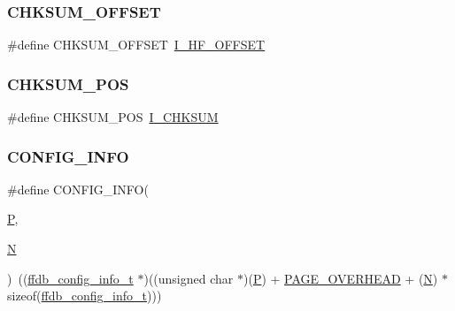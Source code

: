 \subsubsection{\texorpdfstring{CHKSUM\_OFFSET}{CHKSUM\_OFFSET}}
{\footnotesize\ttfamily \#define C\+H\+K\+S\+U\+M\+\_\+\+O\+F\+F\+S\+ET~\mbox{\hyperlink{adat__devel_2other__libs_2filedb_2filehash_2ffdb__page_8h_a1a36cdfb3c84eb14acea8376f6e56c18}{I\+\_\+\+H\+F\+\_\+\+O\+F\+F\+S\+ET}}}

\mbox{\label{adat-devel_2other__libs_2filedb_2filehash_2ffdb__page_8h_a31e1758e4ece4645b0453a914658ea63}} 
\subsubsection{\texorpdfstring{CHKSUM\_POS}{CHKSUM\_POS}}
{\footnotesize\ttfamily \#define C\+H\+K\+S\+U\+M\+\_\+\+P\+OS~\mbox{\hyperlink{adat__devel_2other__libs_2filedb_2filehash_2ffdb__page_8h_a43ab9dfdbc30ecc5327e825522a5541a}{I\+\_\+\+C\+H\+K\+S\+UM}}}

\mbox{\label{adat-devel_2other__libs_2filedb_2filehash_2ffdb__page_8h_a27811a032e8248cf27b27041873d8de0}} 
\subsubsection{\texorpdfstring{CONFIG\_INFO}{CONFIG\_INFO}}
{\footnotesize\ttfamily \#define C\+O\+N\+F\+I\+G\+\_\+\+I\+N\+FO(\begin{DoxyParamCaption}\item[{}]{\mbox{\hyperlink{adat__devel_2lib_2hadron_2operator__name__util_8cc_aef94be98e2c9e4a4dece75f60ca9792c}{P}},  }\item[{}]{\mbox{\hyperlink{adat__devel_2lib_2hadron_2operator__name__util_8cc_a7722c8ecbb62d99aee7ce68b1752f337}{N}} }\end{DoxyParamCaption})~((\mbox{\hyperlink{adat-devel_2other__libs_2filedb_2filehash_2ffdb__db_8h_acc961fbd2faf6a849a1620309100fda1}{ffdb\+\_\+config\+\_\+info\+\_\+t}} $\ast$)((unsigned char $\ast$)(\mbox{\hyperlink{adat__devel_2lib_2hadron_2operator__name__util_8cc_aef94be98e2c9e4a4dece75f60ca9792c}{P}}) + \mbox{\hyperlink{adat__devel_2other__libs_2filedb_2filehash_2ffdb__page_8h_a4be3c5b1517f8928d9819032d1ac4864}{P\+A\+G\+E\+\_\+\+O\+V\+E\+R\+H\+E\+AD}} + (\mbox{\hyperlink{adat__devel_2lib_2hadron_2operator__name__util_8cc_a7722c8ecbb62d99aee7ce68b1752f337}{N}}) $\ast$ sizeof(\mbox{\hyperlink{adat-devel_2other__libs_2filedb_2filehash_2ffdb__db_8h_acc961fbd2faf6a849a1620309100fda1}{ffdb\+\_\+config\+\_\+info\+\_\+t}})))}


